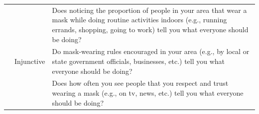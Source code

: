 \documentclass[
  english,
  man,floatsintext]{apa6}
\begin{document}
\begin{center}
\begin{ThreePartTable}
\begin{longtable}{m{2.5cm}m{2.5cm}m{9cm}}
 &  & Does noticing the proportion of people in your area that wear a mask while doing routine activities indoors (e.g., running errands, shopping, going to work) tell you what everyone should be doing?\\
 & Injunctive & Do mask-wearing rules encouraged in your area (e.g., by local or state government officials, businesses, etc.) tell you what everyone should be doing?\\
 &  & Does how often you see people that you respect and trust wearing a mask (e.g., on tv, news, etc.) tell you what everyone should be doing?\\
\bottomrule
\end{longtable}

\end{ThreePartTable}
\end{center}

\newpage



 
  \providecommand{\huxb}[2]{\arrayrulecolor[RGB]{#1}\global\arrayrulewidth=#2pt}
  \providecommand{\huxvb}[2]{\color[RGB]{#1}\vrule width #2pt}
  \providecommand{\huxtpad}[1]{\rule{0pt}{#1}}
  \providecommand{\huxbpad}[1]{\rule[-#1]{0pt}{#1}}
\end{document}
